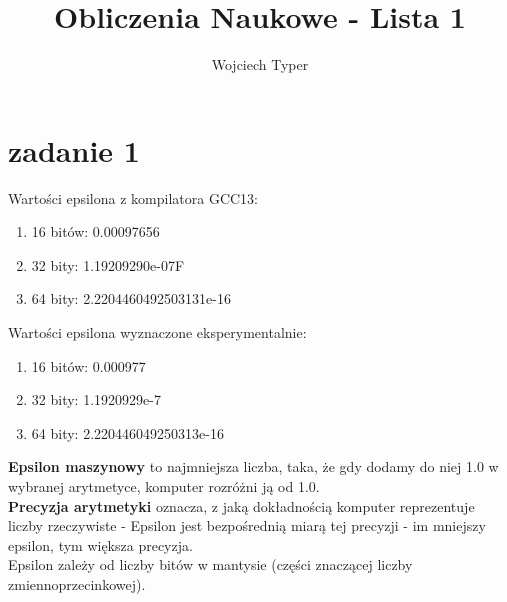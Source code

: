 \documentclass{article}
\title{Obliczenia Naukowe - Lista 1}
\author{Wojciech Typer}
\date{}
\begin{document}
\maketitle

\section*{zadanie 1}
Wartości epsilona z kompilatora GCC13: 

\begin{enumerate}
    \item 16 bitów: 0.00097656
    \item 32 bity: 1.19209290e-07F
    \item 64 bity: 2.2204460492503131e-16
\end{enumerate}

Wartości epsilona wyznaczone eksperymentalnie: \\
\begin{enumerate}
    \item 16 bitów: 0.000977
    \item 32 bity: 1.1920929e-7
    \item 64 bity: 2.220446049250313e-16
\end{enumerate} 

\textbf{Epsilon maszynowy}  to najmniejsza liczba, taka, że gdy dodamy do niej 1.0 w wybranej arytmetyce, komputer rozróżni ją od 1.0. \\
\textbf{Precyzja arytmetyki} oznacza, z jaką dokładnością komputer reprezentuje liczby rzeczywiste - Epsilon jest bezpośrednią miarą tej precyzji - im mniejszy
epsilon, tym większa precyzja. \\ Epsilon zależy od liczby bitów w mantysie (części znaczącej liczby zmiennoprzecinkowej). \\
\end{document}
